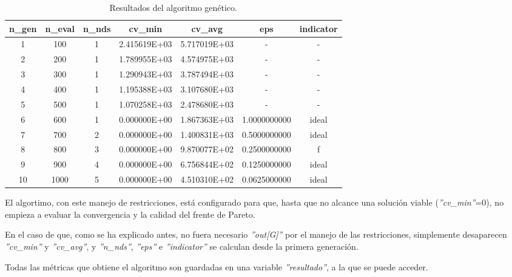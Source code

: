 \begin{table}[h!]
    \centering
    \small %
    \begin{tabularx}{\textwidth}{@{}ccccccc@{}}
        \toprule
        \textbf{n\_gen} & \textbf{n\_eval} & \textbf{n\_nds} & \textbf{cv\_min} & \textbf{cv\_avg} & \textbf{eps} & \textbf{indicator} \\ 
        \midrule
         1 &   100 &  1 & 2.415619E+03 & 5.717019E+03 &          - &          - \\ 
         2 &   200 &  1 & 1.789955E+03 & 4.574975E+03 &          - &          - \\ 
         3 &   300 &  1 & 1.290943E+03 & 3.787494E+03 &          - &          - \\ 
         4 &   400 &  1 & 1.195388E+03 & 3.107680E+03 &          - &          - \\ 
         5 &   500 &  1 & 1.070258E+03 & 2.478680E+03 &          - &          - \\ 
         6 &   600 &  1 & 0.000000E+00 & 1.867363E+03 & 1.0000000000 &     ideal \\ 
         7 &   700 &  2 & 0.000000E+00 & 1.400831E+03 & 0.5000000000 &     ideal \\ 
         8 &   800 &  3 & 0.000000E+00 & 9.870077E+02 & 0.2500000000 &         f \\ 
         9 &   900 &  4 & 0.000000E+00 & 6.756844E+02 & 0.1250000000 &     ideal \\ 
        10 &  1000 &  5 & 0.000000E+00 & 4.510310E+02 & 0.0625000000 &     ideal \\ 
        \bottomrule
    \end{tabularx}
    \caption{Resultados del algoritmo genético.}
    \label{tab:optimizacion}
\end{table}

El algortimo, con este manejo de restricciones, está configurado para que, hasta que no alcance una solución viable (\textit{''cv\_min''}=0), no empieza a evaluar la convergencia y la calidad del frente de Pareto.

En el caso de que, como se ha explicado antes, no fuera necesario \textit{''out[G]''} por el manejo de las restricciones, simplemente desaparecen \textit{''cv\_min''} y \textit{''cv\_avg''}, y \textit{''n\_nds''}, \textit{''eps''} e \textit{''indicator''} se calculan desde la primera generación.

Todas las métricas que obtiene el algoritmo son guardadas en una variable \textit{''resultado''}, a la que se puede acceder.

